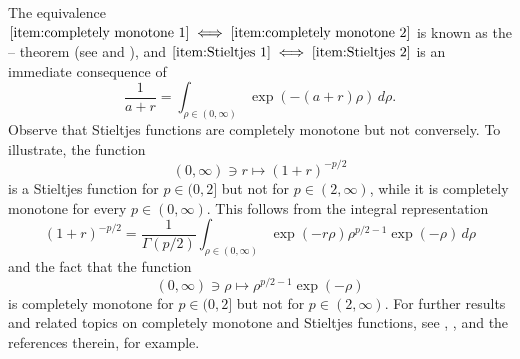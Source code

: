 \documentclass[reqno]{amsart}
\theoremstyle{plain}
\numberwithin{equation}{section}
\theoremstyle{remark}
\newcommand{\intervaloo}[2]{(#1, #2)}
\newcommand{\intervaloc}[2]{(#1, #2]}
\begin{document}
The equivalence $\ref{item:completely monotone 1} \iff \ref{item:completely monotone 2}$ is known as the \citeauthor{Ber1929}--\citeauthor{Wid1931} theorem (see \cite[]{Ber1929} and \cite[Theorem 8]{Wid1931}), and $\ref{item:Stieltjes 1} \iff \ref{item:Stieltjes 2}$ is an immediate consequence of
\begin{equation}
\frac{1}{a+r} = \int_{\rho \in \intervaloo{0}{\infty}} \exp(- (a+r) \rho)  \, d\rho .
\end{equation}
Observe that Stieltjes functions are completely monotone but not conversely.
To illustrate, the function
\begin{equation}
\intervaloo{0}{\infty} \ni r \longmapsto (1 + r)^{-p/2}
\end{equation}
is a Stieltjes function for $p \in \intervaloc{0}{2}$ but not for $p \in \intervaloo{2}{\infty}$, while it is completely monotone for every $p \in \intervaloo{0}{\infty}$.
This follows from the integral representation
\begin{equation}
(1 + r)^{-p/2} = \frac{1}{\Gamma(p/2)} \int_{\rho \in \intervaloo{0}{\infty}} \exp(-r \rho) \rho^{p/2-1} \exp(-\rho) \, d\rho
\end{equation}
and the fact that the function
\begin{equation}
\intervaloo{0}{\infty} \ni \rho \longmapsto \rho^{p/2-1} \exp(-\rho)
\end{equation}
is completely monotone for $p \in \intervaloc{0}{2}$ but not for $p \in \intervaloo{2}{\infty}$.
For further results and related topics on completely monotone and Stieltjes functions, see \citet{Wid1942}, \citet*{SSV2012}, and the references therein, for example.
\end{document}

